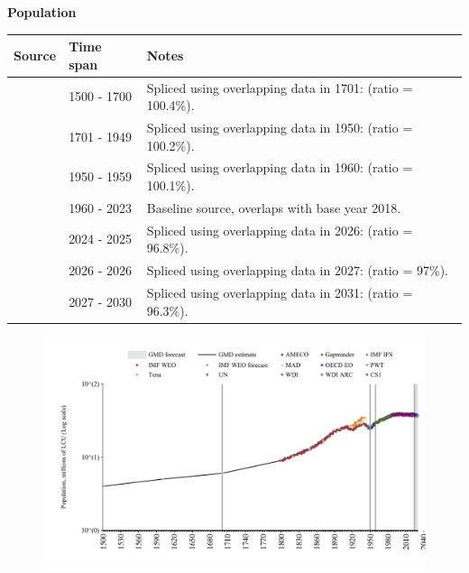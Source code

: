 \documentclass[12pt,a4paper,landscape]{article}
\begin{document}
\begin{adjustbox}{max totalsize={\paperwidth}{\paperheight},center}
\begin{minipage}[t][\textheight][t]{\textwidth}
\vspace*{0.5cm}
{}
\begin{center}
{\Large\bfseries Population}
\end{center}
\vspace{0.5cm}
\begin{table}[H]
\centering
\small
\begin{tabular}{|l|l|l|}
\hline
\textbf{Source} & \textbf{Time span} & \textbf{Notes} \\
\hline
\rowcolor{white}\cite{MAD}& 1500 - 1700 &Spliced using overlapping data in 1701: (ratio = 100.4\%). \\
\rowcolor{lightgray}\cite{Gapminder}& 1701 - 1949 &Spliced using overlapping data in 1950: (ratio = 100.2\%). \\
\rowcolor{white}\cite{IMF_IFS}& 1950 - 1959 &Spliced using overlapping data in 1960: (ratio = 100.1\%). \\
\rowcolor{lightgray}\cite{WDI}& 1960 - 2023 &Baseline source, overlaps with base year 2018. \\
\rowcolor{white}\cite{OECD_EO}& 2024 - 2025 &Spliced using overlapping data in 2026: (ratio = 96.8\%). \\
\rowcolor{lightgray}\cite{AMECO}& 2026 - 2026 &Spliced using overlapping data in 2027: (ratio = 97\%). \\
\rowcolor{white}\cite{Gapminder}& 2027 - 2030 &Spliced using overlapping data in 2031: (ratio = 96.3\%). \\
\hline
\end{tabular}
\end{table}
\begin{figure}[H]
\centering
\includegraphics[width=\textwidth,height=0.6\textheight,keepaspectratio]{graphs/POL_pop.pdf}
\end{figure}
\end{minipage}
\end{adjustbox}
\end{document}
